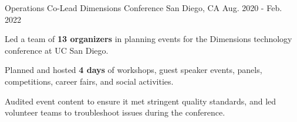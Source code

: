 \begin{cventries}
\cventry
{Operations Co-Lead} %
{Dimensions Conference} %
{San Diego, CA} %
{Aug. 2020 - Feb. 2022} %
{
  \begin{cvitems} %
    \item {Led a team of \textbf{13 organizers} in planning events for the Dimensions technology conference at UC San Diego.}
    \item {Planned and hosted \textbf{4 days} of workshops, guest speaker events, panels, competitions, career fairs, and social activities.}
    \item {Audited event content to ensure it met stringent quality standards, and led volunteer teams to troubleshoot issues during the conference.}
  \end{cvitems}
}


\end{cventries}
